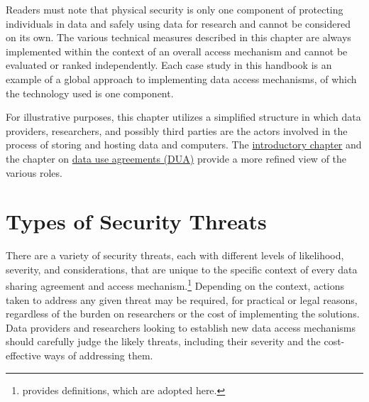 Readers must note that physical security is only one component of protecting individuals in data and safely using data for research and cannot be considered on its own. The various technical measures described in this chapter are always implemented within the context of an overall access mechanism and cannot be evaluated or ranked independently. Each case study in this handbook is an example of a global approach to implementing data access mechanisms, of which the technology used is one component.

For illustrative purposes, this chapter utilizes a simplified structure in which data providers, researchers, and possibly third parties are the actors involved in the process of storing and hosting data and computers. The \protect\hyperlink{intro}{introductory chapter} and the chapter on \protect\hyperlink{dua}{data use agreements (DUA)} provide a more refined view of the various roles.

\hypertarget{types-of-security-threats}{%
\section{Types of Security Threats}\label{types-of-security-threats}}

There are a variety of security threats, each with different levels of likelihood, severity, and considerations, that are unique to the specific context of every data sharing agreement and access mechanism.\footnote{\citet{cichonski2012} provides definitions, which are adopted here.} Depending on the context, actions taken to address any given threat may be required, for practical or legal reasons, regardless of the burden on researchers or the cost of implementing the solutions. Data providers and researchers looking to establish new data access mechanisms should carefully judge the likely threats, including their severity and the cost-effective ways of addressing them.

